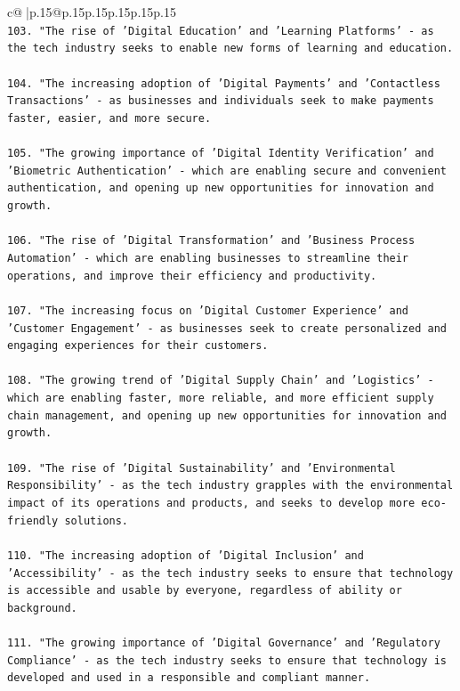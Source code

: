 \documentclass{article}
\begin{document}
{\begin{supertabular}{c@{$\;$}|p{.15\linewidth}@{}p{.15\linewidth}p{.15\linewidth}p{.15\linewidth}p{.15\linewidth}p{.15\linewidth}}
{{{\\ 
\texttt{103. "The rise of 'Digital Education' and 'Learning Platforms' {-} as the tech industry seeks to enable new forms of learning and education.} \\
\\ 
\texttt{104. "The increasing adoption of 'Digital Payments' and 'Contactless Transactions' {-} as businesses and individuals seek to make payments faster, easier, and more secure.} \\
\\ 
\texttt{105. "The growing importance of 'Digital Identity Verification' and 'Biometric Authentication' {-} which are enabling secure and convenient authentication, and opening up new opportunities for innovation and growth.} \\
\\ 
\texttt{106. "The rise of 'Digital Transformation' and 'Business Process Automation' {-} which are enabling businesses to streamline their operations, and improve their efficiency and productivity.} \\
\\ 
\texttt{107. "The increasing focus on 'Digital Customer Experience' and 'Customer Engagement' {-} as businesses seek to create personalized and engaging experiences for their customers.} \\
\\ 
\texttt{108. "The growing trend of 'Digital Supply Chain' and 'Logistics' {-} which are enabling faster, more reliable, and more efficient supply chain management, and opening up new opportunities for innovation and growth.} \\
\\ 
\texttt{109. "The rise of 'Digital Sustainability' and 'Environmental Responsibility' {-} as the tech industry grapples with the environmental impact of its operations and products, and seeks to develop more eco{-}friendly solutions.} \\
\\ 
\texttt{110. "The increasing adoption of 'Digital Inclusion' and 'Accessibility' {-} as the tech industry seeks to ensure that technology is accessible and usable by everyone, regardless of ability or background.} \\
\\ 
\texttt{111. "The growing importance of 'Digital Governance' and 'Regulatory Compliance' {-} as the tech industry seeks to ensure that technology is developed and used in a responsible and compliant manner.} \\
}}}
\end{supertabular}}
\end{document}

